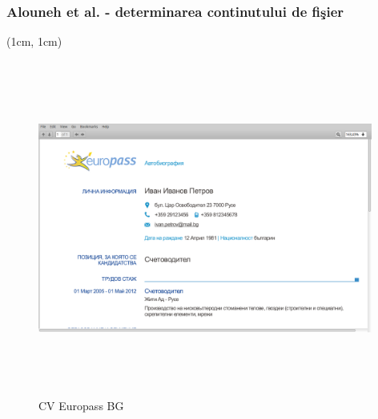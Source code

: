 \documentclass{beamer}
\theoremstyle{definition}
\begin{document}
\begin{frame}
    \frametitle{Alouneh et al. - determinarea continutului de fi\c{s}ier}
     {
        \begin{center}
         \begin{textblock*}{4cm}(1cm, 1cm)
            \begin{figure}
                \includegraphics[width=11cm,height=11cm,keepaspectratio]{img/results/CV_BG.png}
                \caption{CV Europass BG}
           \end{figure}
        \end{textblock*} 
        \end{center}
    }
\end{frame}
\end{document}
